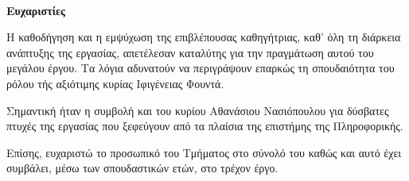 \thispagestyle{empty}

~\\[5cm]
\begin{center}{\bfseries Ευχαριστίες}

Η καθοδήγηση και η εμψύχωση της επιβλέπουσας καθηγήτριας, καθ' όλη τη διάρκεια
ανάπτυξης της εργασίας, απετέλεσαν καταλύτης για την πραγμάτωση αυτού του
μεγάλου έργου. Τα λόγια αδυνατούν να περιγράψουν επαρκώς τη σπουδαιότητα του
ρόλου τής αξιότιμης κυρίας Ιφιγένειας Φουντά.

Σημαντική ήταν η συμβολή και του κυρίου Αθανάσιου Νασιόπουλου για δύσβατες
πτυχές της εργασίας που ξεφεύγουν από τα πλαίσια της επιστήμης της Πληροφορικής.

Επίσης, ευχαριστώ το προσωπικό του Τμήματος στο σύνολό του καθώς και αυτό έχει
συμβάλει, μέσω των σπουδαστικών ετών, στο τρέχον έργο.
\end{center}

\cleardoublepage
